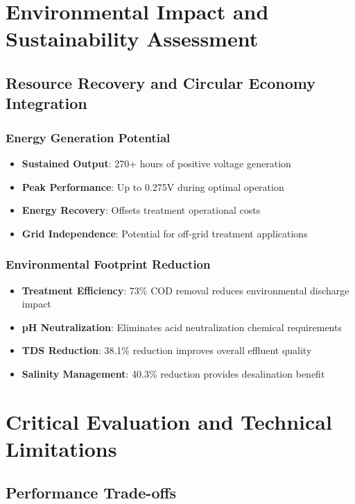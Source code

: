 \documentclass[12pt,a4paper]{article}
\begin{document}
\section{Environmental Impact and Sustainability Assessment}

\subsection{Resource Recovery and Circular Economy Integration}

\subsubsection{Energy Generation Potential}

\begin{itemize}
    \item \textbf{Sustained Output}: 270+ hours of positive voltage generation
    \item \textbf{Peak Performance}: Up to 0.275V during optimal operation
    \item \textbf{Energy Recovery}: Offsets treatment operational costs
    \item \textbf{Grid Independence}: Potential for off-grid treatment applications
\end{itemize}

\subsubsection{Environmental Footprint Reduction}

\begin{itemize}
    \item \textbf{Treatment Efficiency}: 73\% COD removal reduces environmental discharge impact
    \item \textbf{pH Neutralization}: Eliminates acid neutralization chemical requirements
    \item \textbf{TDS Reduction}: 38.1\% reduction improves overall effluent quality
    \item \textbf{Salinity Management}: 40.3\% reduction provides desalination benefit
\end{itemize}

\section{Critical Evaluation and Technical Limitations}

\subsection{Performance Trade-offs}
\end{document}
